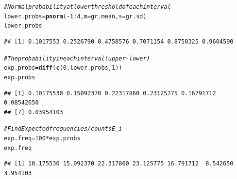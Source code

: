 \documentclass[t,xcolor=pdftex,dvipsnames,table]{beamer}\usepackage[]{graphicx}\usepackage[]{color}
\makeatletter
\newcommand{\hlnum}[1]{\textcolor[rgb]{0.686,0.059,0.569}{#1}}%
\newcommand{\hlcom}[1]{\textcolor[rgb]{0.678,0.584,0.686}{\textit{#1}}}%
\newcommand{\hlopt}[1]{\textcolor[rgb]{0,0,0}{#1}}%
\newcommand{\hlstd}[1]{\textcolor[rgb]{0.345,0.345,0.345}{#1}}%
\newcommand{\hlkwb}[1]{\textcolor[rgb]{0.69,0.353,0.396}{#1}}%
\newcommand{\hlkwc}[1]{\textcolor[rgb]{0.333,0.667,0.333}{#1}}%
\newcommand{\hlkwd}[1]{\textcolor[rgb]{0.737,0.353,0.396}{\textbf{#1}}}%
\newenvironment{kframe}{%
 \def\at@end@of@kframe{}%
 \ifinner\ifhmode%
  \def\at@end@of@kframe{\end{minipage}}%
  \begin{minipage}{\columnwidth}%
 \fi\fi%
 \def\FrameCommand##1{\hskip\@totalleftmargin \hskip-\fboxsep
 \colorbox{shadecolor}{##1}\hskip-\fboxsep
     \hskip-\linewidth \hskip-\@totalleftmargin \hskip\columnwidth}%
 \MakeFramed {\advance\hsize-\width
   \@totalleftmargin\z@ \linewidth\hsize
   \@setminipage}}%
 {\par\unskip\endMakeFramed%
 \at@end@of@kframe}
\newenvironment{knitrout}{}{} %
\makeatother
\begin{document}
\begin{frame}[fragile]{}
\begin{knitrout}
\color{fgcolor}\begin{kframe}
\begin{alltt}
\hlcom{#Normal probability at lower threshold of each interval}
\hlstd{lower.probs}\hlkwb{=}\hlkwd{pnorm}\hlstd{(}\hlopt{-}\hlnum{1}\hlopt{:}\hlnum{4}\hlstd{,}\hlkwc{m}\hlstd{=gr.mean,}\hlkwc{s}\hlstd{=gr.sd)}
\hlstd{lower.probs}
\end{alltt}
\begin{verbatim}
## [1] 0.1017553 0.2526790 0.4758576 0.7071154 0.8750325 0.9604590
\end{verbatim}
\begin{alltt}
\hlcom{#The probability in each interval (upper-lower)}
\hlstd{exp.probs}\hlkwb{=}\hlkwd{diff}\hlstd{(}\hlkwd{c}\hlstd{(}\hlnum{0}\hlstd{,lower.probs,}\hlnum{1}\hlstd{))}
\hlstd{exp.probs}
\end{alltt}
\begin{verbatim}
## [1] 0.10175530 0.15092370 0.22317860 0.23125775 0.16791712 0.08542650
## [7] 0.03954103
\end{verbatim}
\begin{alltt}
\hlcom{#Find Expected frequencies/counts E_i}
\hlstd{exp.freq}\hlkwb{=} \hlnum{100}\hlopt{*} \hlstd{exp.probs}
\hlstd{exp.freq}
\end{alltt}
\begin{verbatim}
## [1] 10.175530 15.092370 22.317860 23.125775 16.791712  8.542650  3.954103
\end{verbatim}
\end{kframe}
\end{knitrout}
\end{frame}
\end{document}

